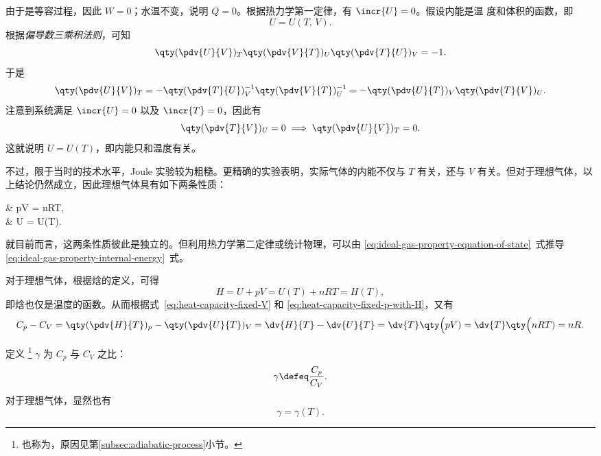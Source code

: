 由于是等容过程，因此 $W=0$；水温不变，说明 $Q=0$。根据热力学第一定律，有 $\incr{U}=0$。假设内能是温
度和体积的函数，即
\begin{equation}
  U = U(T, \, V).
\end{equation}
根据\emph{偏导数三乘积法则}，可知
\begin{equation}
  \qty(\pdv{U}{V})_T \qty(\pdv{V}{T})_U \qty(\pdv{T}{U})_V = -1.
\end{equation}
于是
\begin{equation}
  \qty(\pdv{U}{V})_T
  = -\qty(\pdv{T}{U})_V^{-1} \qty(\pdv{V}{T})_U^{-1}
  = -\qty(\pdv{U}{T})_V \qty(\pdv{T}{V})_U.
\end{equation}
注意到系统满足 $\incr{U}=0$ 以及 $\incr{T}=0$，因此有
\begin{equation}
  \qty(\pdv{T}{V})_U = 0 \implies \qty(\pdv{U}{V})_T = 0.
\end{equation}
这就说明 $U = U(T)$，即内能只和温度有关。

不过，限于当时的技术水平，Joule 实验较为粗糙。更精确的实验表明，实际气体的内能不仅与 $T$ 有关，还与 $V$ 有关。但对于理想气体，以上结论仍然成立，因此理想气体具有如下两条性质：
\begin{braced}
  & pV = nRT,  \label{eq:ideal-gas-property-equation-of-state}\\
  & U  = U(T). \label{eq:ideal-gas-property-internal-energy}
\end{braced}
就目前而言，这两条性质彼此是独立的。但利用热力学第二定律或统计物理，可以由
\eqref{eq:ideal-gas-property-equation-of-state}~式推导
\eqref{eq:ideal-gas-property-internal-energy}~式。

对于理想气体，根据焓的定义，可得
\begin{equation}
  H = U + pV = U(T) + nRT = H(T),
\end{equation}
即焓也仅是温度的函数。从而根据式~\eqref{eq:heat-capacity-fixed-V} 和
\eqref{eq:heat-capacity-fixed-p-with-H}，又有
\begin{equation}
  C_p - C_V = \qty(\pdv{H}{T})_p - \qty(\pdv{U}{T})_V
  = \dv{H}{T} - \dv{U}{T} = \dv{T} \qty\Big(pV) = \dv{T} \qty\Big(nRT) = nR.
  \label{eq:C_p-C_V-for-ideal-gas}
\end{equation}

定义
\footnote{也称为，原因见第\ref{subsec:adiabatic-process}小节。}
$\gamma$ 为 $C_p$ 与 $C_V$ 之比：
\begin{equation} \label{eq:heat-capacity-ratio}
  \gamma \defeq \frac{C_p}{C_V}.
\end{equation}
对于理想气体，显然也有
\begin{equation}
  \gamma = \gamma(T).
\end{equation}

